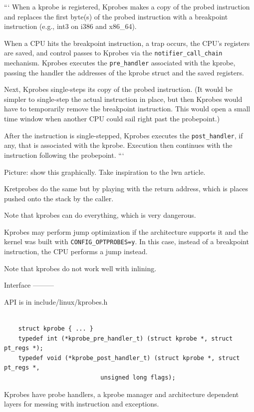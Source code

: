 ```
When a kprobe is registered, Kprobes makes a copy of the probed
instruction and replaces the first byte(s) of the probed instruction
with a breakpoint instruction (e.g., int3 on i386 and x86\_64).

When a CPU hits the breakpoint instruction, a trap occurs, the CPU’s
registers are saved, and control passes to Kprobes via the
\verb|notifier_call_chain| mechanism. Kprobes executes the \verb|pre_handler|
associated with the kprobe, passing the handler the addresses of the
kprobe struct and the saved registers.

Next, Kprobes single-steps its copy of the probed instruction. (It
would be simpler to single-step the actual instruction in place, but
then Kprobes would have to temporarily remove the breakpoint
instruction. This would open a small time window when another CPU
could sail right past the probepoint.)

After the instruction is single-stepped, Kprobes executes the
\verb|post_handler|, if any, that is associated with the kprobe. Execution
then continues with the instruction following the probepoint.
```

Picture: show this graphically. Take inspiration to the lwn article.

Kretprobes do the same but by playing with the return address, which
is places pushed onto the stack by the caller.

Note that kprobes can do everything, which is very dangerous.

Kprobes may perform jump optimization if the architecture supports
it and the kernel was built with \verb|CONFIG_OPTPROBES=y|. In this case,
instead of a breakpoint instruction, the CPU performs a jump instead.

Note that kprobes do not work well with inlining.

Interface
---------

API is in include/linux/kprobes.h

\begin{verbatim}

    struct kprobe { ... }
    typedef int (*kprobe_pre_handler_t) (struct kprobe *, struct pt_regs *);
    typedef void (*kprobe_post_handler_t) (struct kprobe *, struct pt_regs *,
		    		       unsigned long flags);

\end{verbatim}

Kprobes have probe handlers, a kprobe manager and architecture
dependent layers for messing with instruction and exceptions.

